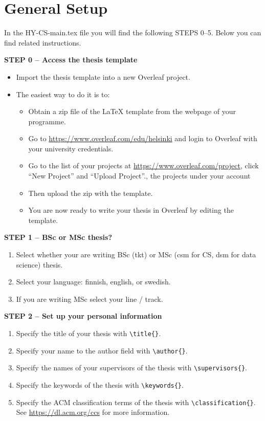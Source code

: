 

\section{General Setup}

In the HY-CS-main.tex file you will find the following STEPS 0--5. Below you can find related instructions.
\vspace{0.5cm}

\textbf{STEP 0 -- Access the thesis template}

\begin{itemize}
\item Import the thesis template into a new Overleaf project.
\item The easiest way to do it is to:
\begin{itemize}
    \item Obtain a zip file of the LaTeX template from the webpage of your programme.
    \item Go to \url{https://www.overleaf.com/edu/helsinki} and login to Overleaf with your university credentials.
    \item Go to the list of your projects at \url{https://www.overleaf.com/project}, click ``New Project'' and ``Upload Project''.,  the projects under your account 
    \item Then upload the zip with the template.
    \item You are now ready to write your thesis in Overleaf by editing the template.
\end{itemize}
\end{itemize}


{\textbf{STEP 1 -- BSc or MSc thesis?}}
\begin{enumerate}
\item Select whether your are writing BSc (tkt) or MSc (csm for CS, dsm for data science) thesis.
\item Select your language: finnish, english, or swedish.
\item If you are writing MSc select your line / track.
\end{enumerate}


{\textbf{STEP 2 -- Set up your personal information}}

\begin{enumerate}
\item Specify the title of your thesis with \texttt{\textbackslash title\{\}}.
\item Specify your name to the author field with \texttt{\textbackslash author\{\}}.
\item Specify the names of your supervisors of the thesis with \texttt{\textbackslash supervisors\{\}}.
\item Specify the keywords of the thesis with \texttt{\textbackslash keywords\{\}}.
\item Specify the ACM classification terms of the thesis with \texttt{\textbackslash classification\{\}}. See \url{https://dl.acm.org/ccs} for more information.
\end{enumerate}


